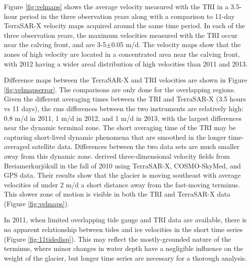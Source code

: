  Figure \ref{fig:velmaps} shows the average velocity measured with the TRI in a 3.5-hour period in the three observation years along with a comparison to 11-day TerraSAR-X velocity maps acquired around the same time period. 
In each of the three observation years, the maximum velocities measured with the TRI occur near the calving front, and are 3-5$\pm$0.05 m/d. The velocity maps show that the zones of high velocity are located in a concentrated area near the calving front, with 2012 having a wider areal distribution of high velocities than 2011 and 2013. 




 Difference maps between the TerraSAR-X and TRI velocities are shown in Figure \ref{fig:velmapserror}. The comparisons are only done for the overlapping regions. Given the different averaging times between the TRI and TerraSAR-X (3.5 hours vs 11 days), the rms differences between the two instruments are relatively high: 0.8 m/d in 2011, 1 m/d in 2012, and 1 m/d in 2013, with the largest differences near the dynamic terminal zone. The short averaging time of the TRI may be capturing short-lived dynamic phenomena that are smoothed in the longer time-averaged satellite data. Differences between the two data sets are much smaller away from this dynamic zone.
\citet{nagler2012retrieval} derived three-dimensional velocity fields from Brei{\dh}amerkurjökull in the fall of 2010 using TerraSAR-X, COSMO-SkyMed, and GPS data. Their results show that the glacier is moving southeast with average velocities of under 2 m/d a short distance away from the fast-moving terminus. This slower zone of motion is visible in both the TRI and TerraSAR-X data (Figure \ref{fig:velmaps}).


In 2011, when limited overlapping tide gauge and TRI data are available, there is no apparent relationship between tides and ice velocities in the short time series (Figure \ref{fig:11tidedisp}). This may reflect the mostly-grounded nature of the terminus, where minor changes in water depth have a negligible influence on the weight of the glacier, but longer time series are necessary for a thorough analysis.

